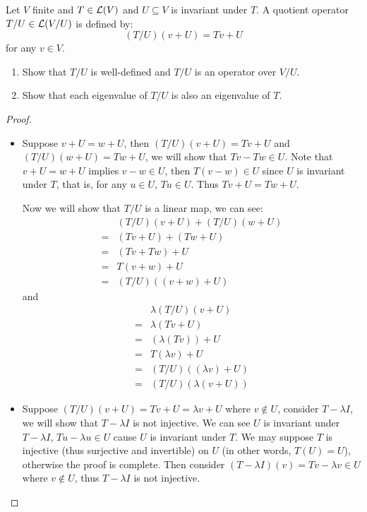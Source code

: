\documentclass[../main.tex]{subfiles}
\begin{document}
\begin{exercise}
  Let $V$ finite and $T \in \mathcal{L}(V)$ and $U \subseteq V$ is
  invariant under $T$. A quotient operator $T/U \in \mathcal{L}(V/U)$ is defined by:
  \[
    (T/U)(v + U) = Tv + U
  \]
  for any $v \in V$.

  \begin{enumerate}
    \item Show that $T/U$ is well-defined and $T/U$ is an operator over $V/U$.
    \item Show that each eigenvalue of $T/U$ is also an eigenvalue of $T$.
  \end{enumerate}
\end{exercise}
\begin{proof}
  ~
  \begin{itemize}
    \item Suppose $v + U = w + U$, then $(T/U)(v + U) = Tv + U$ and $(T/U)(w + U) = Tw + U$,
          we will show that $Tv - Tw \in U$.
          Note that $v + U = w + U$ implies $v - w \in U$, then $T(v - w) \in U$ since $U$
          is invariant under $T$, that is, for any $u \in U$, $Tu \in U$.
          Thus $Tv + U = Tw + U$.

          Now we will show that $T/U$ is a linear map, we can see:
          \begin{align*}
             & (T/U)(v + U) + (T/U)(w + U) \\
            =& (Tv + U) + (Tw + U) \\
            =& (Tv + Tw) + U \\
            =& T(v + w) + U \\
            =& (T/U)((v + w) + U)
          \end{align*}
          and
          \begin{align*}
             & \lambda (T/U)(v + U) \\
            =& \lambda (Tv + U) \\
            =& (\lambda (Tv)) + U \\
            =& T(\lambda v) + U \\
            =& (T/U)((\lambda v) + U) \\
            =& (T/U)(\lambda (v + U))
          \end{align*}
    \item Suppose $(T/U)(v + U) = Tv + U = \lambda v + U$ where $v \notin U$, consider $T - \lambda I$,
          we will show that $T - \lambda I$ is not injective.
          We can see $U$ is invariant under $T - \lambda I$,
          $Tu - \lambda u \in U$ cause $U$ is invariant under $T$.
          We may suppose $T$ is injective (thus surjective and invertible) on $U$
          (in other words, $T(U) = U$),
          otherwise the proof is complete.
          Then consider $(T - \lambda I)(v) = Tv - \lambda v \in U$ where $v \notin U$,
          thus $T - \lambda I$ is not injective.
  \end{itemize}
\end{proof}
\end{document}

